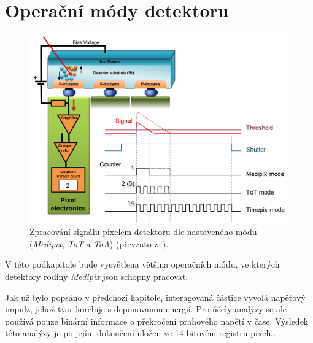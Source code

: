 \section{Operační módy detektoru}\label{chap:detectors:operation_modes}
\begin{figure}[th]
	\begin{center}
		\includegraphics[width=14cm]{figures/det_pix.png}
		\caption{Zpracování signálu pixelem detektoru dle nastaveného módu (\textit{Medipix}, \textit{ToT} a \textit{ToA}) (převzato z~\cite{PlatkevicDisertace}).}
		\label{fig:det:modes}
	\end{center}
\end{figure}


V této podkapitole bude vysvětlena většina operačních módu, ve kterých detektory rodiny \textit{Medipix} jsou schopny pracovat. 

Jak už bylo popsáno v předchozí kapitole, interagovaná částice vyvolá napěťový impulz, jehož tvar koreluje s deponovanou energií. Pro účely analýzy se ale používá pouze binární informace o překročení prahového napětí v čase. Výsledek této analýzy je po jejím dokončení uložen ve 14-bitovém registru pixelu.

